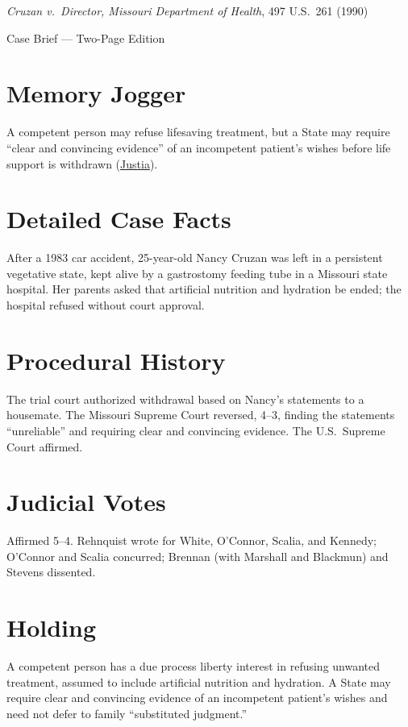 \documentclass[12pt]{article}
\begin{document}
\begin{center}
{\LARGE \textit{Cruzan v.\ Director, Missouri Department of Health}, 497 U.S.\ 261 (1990)\par}
\vspace{0.5em}
{\large Case Brief --- Two-Page Edition\par}
\end{center}

\section{Memory Jogger}
A competent person may refuse lifesaving treatment, but a State may require ``clear and convincing evidence'' of an incompetent patient's wishes before life support is withdrawn (\href{https://supreme.justia.com/cases/federal/us/497/261/}{Justia}).

\section{Detailed Case Facts}
After a 1983 car accident, 25-year-old Nancy Cruzan was left in a persistent vegetative state, kept alive by a gastrostomy feeding tube in a Missouri state hospital. Her parents asked that artificial nutrition and hydration be ended; the hospital refused without court approval.

\section{Procedural History}
The trial court authorized withdrawal based on Nancy's statements to a housemate. The Missouri Supreme Court reversed, 4--3, finding the statements ``unreliable'' and requiring clear and convincing evidence. The U.S.\ Supreme Court affirmed.

\section{Judicial Votes}
Affirmed 5--4. Rehnquist wrote for White, O'Connor, Scalia, and Kennedy; O'Connor and Scalia concurred; Brennan (with Marshall and Blackmun) and Stevens dissented.

\section{Holding}
A competent person has a due process liberty interest in refusing unwanted treatment, assumed to include artificial nutrition and hydration. A State may require clear and convincing evidence of an incompetent patient's wishes and need not defer to family ``substituted judgment.''
\end{document}
